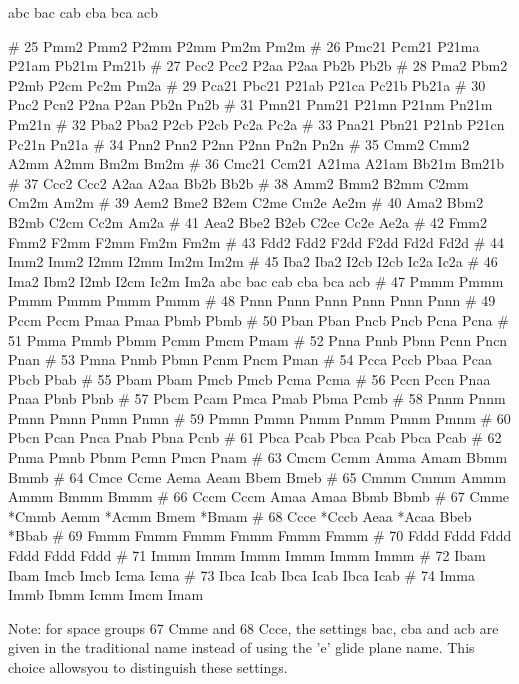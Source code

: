         abc      bac      cab      cba      bca      acb 
\begin{MacVerbatim}
#  25   Pmm2     Pmm2     P2mm     P2mm     Pm2m     Pm2m
#  26   Pmc21    Pcm21    P21ma    P21am    Pb21m    Pm21b
#  27   Pcc2     Pcc2     P2aa     P2aa     Pb2b     Pb2b
#  28   Pma2     Pbm2     P2mb     P2cm     Pc2m     Pm2a
#  29   Pca21    Pbc21    P21ab    P21ca    Pc21b    Pb21a
#  30   Pnc2     Pcn2     P2na     P2an     Pb2n     Pn2b
#  31   Pmn21    Pnm21    P21mn    P21nm    Pn21m    Pm21n
#  32   Pba2     Pba2     P2cb     P2cb     Pc2a     Pc2a
#  33   Pna21    Pbn21    P21nb    P21cn    Pc21n    Pn21a
#  34   Pnn2     Pnn2     P2nn     P2nn     Pn2n     Pn2n
#  35   Cmm2     Cmm2     A2mm     A2mm     Bm2m     Bm2m
#  36   Cmc21    Ccm21    A21ma    A21am    Bb21m    Bm21b
#  37   Ccc2     Ccc2     A2aa     A2aa     Bb2b     Bb2b
#  38   Amm2     Bmm2     B2mm     C2mm     Cm2m     Am2m
#  39   Aem2     Bme2     B2em     C2me     Cm2e     Ae2m
#  40   Ama2     Bbm2     B2mb     C2cm     Cc2m     Am2a
#  41   Aea2     Bbe2     B2eb     C2ce     Cc2e     Ae2a
#  42   Fmm2     Fmm2     F2mm     F2mm     Fm2m     Fm2m
#  43   Fdd2     Fdd2     F2dd     F2dd     Fd2d     Fd2d
#  44   Imm2     Imm2     I2mm     I2mm     Im2m     Im2m
#  45   Iba2     Iba2     I2cb     I2cb     Ic2a     Ic2a
#  46   Ima2     Ibm2     I2mb     I2cm     Ic2m     Im2a
        abc      bac      cab      cba      bca      acb
#  47   Pmmm     Pmmm     Pmmm     Pmmm     Pmmm     Pmmm
#  48   Pnnn     Pnnn     Pnnn     Pnnn     Pnnn     Pnnn
#  49   Pccm     Pccm     Pmaa     Pmaa     Pbmb     Pbmb
#  50   Pban     Pban     Pncb     Pncb     Pcna     Pcna
#  51   Pmma     Pmmb     Pbmm     Pcmm     Pmcm     Pmam
#  52   Pnna     Pnnb     Pbnn     Pcnn     Pncn     Pnan
#  53   Pmna     Pnmb     Pbmn     Pcnm     Pncm     Pman
#  54   Pcca     Pccb     Pbaa     Pcaa     Pbcb     Pbab
#  55   Pbam     Pbam     Pmcb     Pmcb     Pcma     Pcma
#  56   Pccn     Pccn     Pnaa     Pnaa     Pbnb     Pbnb
#  57   Pbcm     Pcam     Pmca     Pmab     Pbma     Pcmb
#  58   Pnnm     Pnnm     Pmnn     Pmnn     Pnmn     Pnmn
#  59   Pmmn     Pmmn     Pnmm     Pnmm     Pmnm     Pmnm
#  60   Pbcn     Pcan     Pnca     Pnab     Pbna     Pcnb
#  61   Pbca     Pcab     Pbca     Pcab     Pbca     Pcab
#  62   Pnma     Pmnb     Pbnm     Pcmn     Pmcn     Pnam
#  63   Cmcm     Ccmm     Amma     Amam     Bbmm     Bmmb
#  64   Cmce     Ccme     Aema     Aeam     Bbem     Bmeb
#  65   Cmmm     Cmmm     Ammm     Ammm     Bmmm     Bmmm
#  66   Cccm     Cccm     Amaa     Amaa     Bbmb     Bbmb
#  67   Cmme    *Cmmb     Aemm    *Acmm     Bmem    *Bmam
#  68   Ccce    *Cccb     Aeaa    *Acaa     Bbeb    *Bbab
#  69   Fmmm     Fmmm     Fmmm     Fmmm     Fmmm     Fmmm
#  70   Fddd     Fddd     Fddd     Fddd     Fddd     Fddd
#  71   Immm     Immm     Immm     Immm     Immm     Immm
#  72   Ibam     Ibam     Imcb     Imcb     Icma     Icma
#  73   Ibca     Icab     Ibca     Icab     Ibca     Icab
#  74   Imma     Immb     Ibmm     Icmm     Imcm     Imam
\end{MacVerbatim}
Note: for space groups 67 Cmme and 68 Ccce, the settings 
bac, cba and acb are given in the traditional name 
instead of using the 'e' glide plane name. This choice 
allowsyou to distinguish these settings. 
